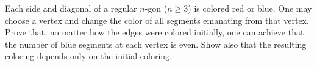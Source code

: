Each side and diagonal of a regular $n$-gon ($n \ge 3$) is colored red or blue. One may choose a vertex and change the color of all segments emanating from that vertex. Prove that, no matter how the edges were colored initially, one can achieve that the number of blue segments at each vertex is even. Show also that the resulting coloring depends only on the initial coloring.